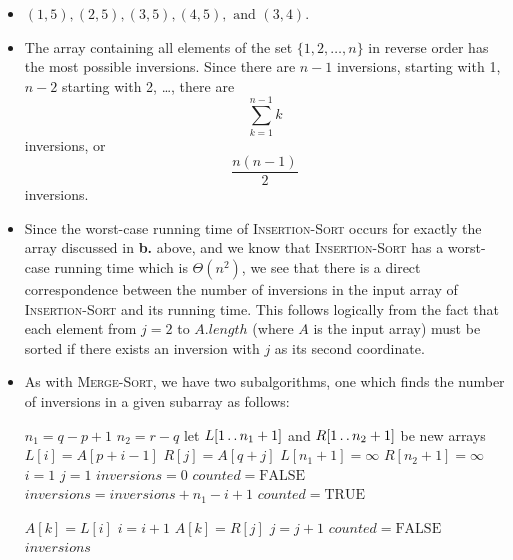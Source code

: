 \begin{itemize}
  \item[\textbf{a.}]$(1, 5), (2, 5), (3, 5), (4, 5), \text{ and } (3, 4)$.
  \item[\textbf{b.}] The array containing all elements of the set
    $\lbrace 1, 2, \ldots, n \rbrace$ in reverse order has the most
    possible inversions. Since there are $n - 1$ inversions, starting with
    1, $n - 2$ starting with 2, \ldots, there are
    \[
      \sum_{k=1}^{n-1} k
    \]
    inversions, or
    \[
      \frac{n(n - 1)}{2}
    \]
    inversions.
  \item[\textbf{c.}] Since the worst-case running time of
    \textsc{Insertion-Sort}
    occurs for exactly the array discussed in \textbf{b.} above, and
    we know that
    \textsc{Insertion-Sort} has a worst-case running time which is
    $\Theta(n^2)$,
    we see that there is a direct correspondence between the number
    of inversions
    in the input array of \textsc{Insertion-Sort} and its running time. This
    follows logically from the fact that each element from $j = 2$ to
    $A.\mathit{length}$ (where $A$ is the input array) must be sorted if there
    exists an inversion with $j$ as its second coordinate.
  \item[\textbf{d.}] As with \textsc{Merge-Sort}, we have two subalgorithms, one
    which finds the number of inversions in a given subarray as follows:

    \begin{algorithmic}[1]
      \STATE $n_1 = q - p + 1$
      \STATE $n_2 = r - q$
      \STATE let $L[1\mathinner{{\ldotp}\,{\ldotp}} n_1 + 1]$ and $R[1\mathinner{{\ldotp}\,{\ldotp}} n_2 + 1]$
      be new arrays
      \STATE $L[i] = A[p + i - 1]$
      \ENDFOR
      \STATE $R[j] = A[q + j]$
      \ENDFOR
      \STATE $L[n_1 + 1] = \infty$
      \STATE $R[n_2 + 1] = \infty$
      \STATE $i = 1$
      \STATE $j = 1$
      \STATE $\mathit{inversions} = 0$
      \STATE $\mathit{counted} = \textrm{FALSE}$
      \STATE $\mathit{inversions} = \mathit{inversions} + n_1 - i + 1$
      \STATE $\mathit{counted} = \textrm{TRUE}$
      \ENDIF

      \STATE $A[k] = L[i]$
      \STATE $i = i + 1$
      \ELSE
      \STATE $A[k] = R[j]$
      \STATE $j = j + 1$
      \STATE $\mathit{counted} = \textrm{FALSE}$
      \ENDIF
      \ENDFOR
      \RETURN $\mathit{inversions}$
    \end{algorithmic}


\end{itemize}
